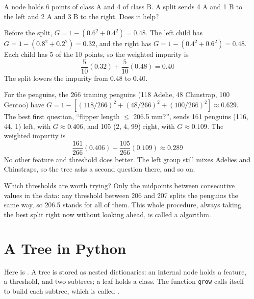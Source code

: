 \begin{Worked}
\begin{Problem}
A node holds 6 points of class A and 4 of class B. A split sends 4 A and 1 B to the left and
2 A and 3 B to the right. Does it help?
\end{Problem}
\begin{Solution}
Before the split, $G = 1 - (0.6^2 + 0.4^2) = 0.48$. The left child has
$G = 1 - (0.8^2 + 0.2^2) = 0.32$, and the right has $G = 1 - (0.4^2 + 0.6^2) = 0.48$. Each child has 5 of the 10
points, so the weighted impurity is
$$\frac{5}{10}(0.32) + \frac{5}{10}(0.48) = 0.40$$
The split lowers the impurity from 0.48 to 0.40.
\end{Solution}
\end{Worked}

For the penguins, the 266 training penguins (118 Adelie, 48 Chinstrap, 100 Gentoo) have
$G = 1 - \left[(118/266)^2 + (48/266)^2 + (100/266)^2\right] \approx 0.629$. The best first question,
``flipper length $\le$ 206.5 mm?'', sends 161 penguins (116, 44, 1) left, with $G \approx 0.406$, and 105 (2, 4, 99)
right, with $G \approx 0.109$. The weighted impurity is
$$\frac{161}{266}(0.406) + \frac{105}{266}(0.109) \approx 0.289$$
No other feature and threshold does better. The left group still mixes Adelies and Chinstraps, so the tree asks
a second question there, and so on.

Which thresholds are worth trying? Only the midpoints between consecutive values in the data: any threshold
between 206 and 207 splits the penguins the same way, so 206.5 stands for all of them. This whole procedure, always
taking the best split right now without looking ahead, is called a  algorithm.

\section{A Tree in Python}
Here is . A tree is stored as nested dictionaries: an internal node holds a feature, a
threshold, and two subtrees; a leaf holds a class. The function \verb|grow| calls itself to build each subtree,
which is called .

